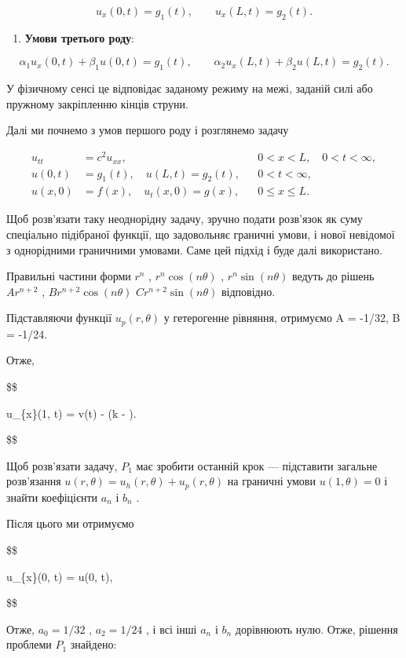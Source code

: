 \documentclass[
  ukrainian,
]{article}
\providecommand{\tightlist}{%
  \setlength{\itemsep}{0pt}\setlength{\parskip}{0pt}}
\begin{document}
\[
u_x(0,t)=g_1(t), \qquad u_x(L,t)=g_2(t).
\]

\begin{enumerate}
\def\labelenumi{\arabic{enumi}.}
\setcounter{enumi}{2}
\tightlist
\item
  \textbf{Умови третього роду}:
\end{enumerate}

\[
\alpha_1 u_x(0,t)+\beta_1 u(0,t)=g_1(t), \qquad
\alpha_2 u_x(L,t)+\beta_2 u(L,t)=g_2(t).
\]

У фізичному сенсі це відповідає заданому режиму на межі, заданій силі
або пружному закріпленню кінців струни.

Далі ми почнемо з умов першого роду і розглянемо задачу

\[
\begin{aligned}
u_{tt} &= c^2u_{xx}, && 0 < x < L,\quad 0 < t < \infty, \\
u(0,t) &= g_1(t), \quad u(L,t) = g_2(t), && 0 < t < \infty, \\
u(x,0) &= f(x), \quad u_t(x,0) = g(x), && 0 \leqslant x \leqslant L.
\end{aligned}
\]

Щоб розв'язати таку неоднорідну задачу, зручно подати розв'язок як суму
спеціально підібраної функції, що задовольняє граничні умови, і нової
невідомої з однорідними граничними умовами. Саме цей підхід і буде далі
використано.

Правильні частини форми \(r^n\) , \(r^n \cos{(n\theta)}\) ,
\(r^n \sin{(n\theta)}\) ведуть до рішень \(Ar^{n+2}\) ,
\(Br^{n+2} \cos{(n\theta)}\) \(Cr^{n+2} \sin{(n\theta)}\) відповідно.

Підставляючи функції \(u_p(r, \theta)\) у гетерогенне рівняння,
отримуємо A = -1/32, B = -1/24.

Отже,

\$\$

u\_\{x\}(1, t) =  v(t) - (k - ).

\$\$

Щоб розв'язати задачу, \(P_1\) має зробити останній крок --- підставити
загальне розв'язання \(u(r, \theta) = u_h(r, \theta) + u_p(r, \theta)\)
на граничні умови \(u(1, \theta) = 0\) і знайти коефіцієнти \(a_n\) і
\(b_n\) .

Після цього ми отримуємо

\$\$

u\_\{x\}(0, t) =  u(0, t),

\$\$

Отже, \(a_0=1/32\) , \(a_2=1/24\) , і всі інші \(a_n\) і \(b_n\)
дорівнюють нулю. Отже, рішення проблеми \(P_1\) знайдено:
\end{document}
